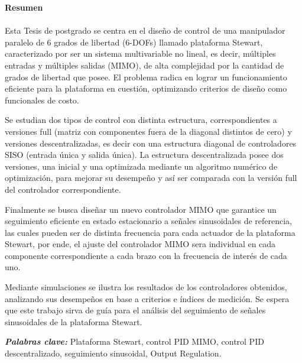 \clearpage
\setlength{\parindent}{0cm}
    \vspace{15mm}
	{\huge {\bf Resumen}}\\
\vspace{2cm}
	\large
	\\

Esta Tesis de postgrado se centra en el diseño de control de una manipulador paralelo de 6 grados de libertad (6-DOFs) llamado plataforma Stewart, caracterizado por ser un sistema multivariable no lineal, es decir, múltiples entradas y múltiples salidas (MIMO), de alta complejidad por la cantidad de grados de libertad que posee. El problema radica en lograr un funcionamiento eficiente para la plataforma en cuestión, optimizando criterios de diseño como funcionales de costo.

Se estudian dos tipos de control con distinta estructura, correspondientes a versiones full (matriz con componentes fuera de la diagonal distintos de cero) y versiones descentralizadas, es decir con una estructura diagonal de controladores SISO (entrada única y salida única). La estructura descentralizada posee dos versiones, una inicial y una optimizada mediante un algoritmo numérico de optimización, para mejorar su  desempeño y así ser comparada con la versión full del controlador correspondiente. 

Finalmente se busca diseñar un nuevo controlador MIMO que garantice un seguimiento eficiente en estado estacionario a señales sinusoidales de referencia, las cuales pueden ser de distinta frecuencia para cada actuador de la plataforma Stewart, por ende, el ajuste del controlador MIMO sera individual en cada componente correspondiente a cada brazo con la frecuencia de interés de cada uno. 

Mediante simulaciones se ilustra los resultados de los controladores obtenidos, analizando sus desempeños en base a criterios e índices de medición. Se espera que este trabajo sirva de guía para el análisis del seguimiento de señales sinusoidales de la plataforma Stewart.
\\
\vspace{10mm}

\textit{\textbf{Palabras clave:}} Plataforma Stewart, control PID MIMO, control PID descentralizado, seguimiento sinusoidal, Output Regulation.
\vspace{1cm}